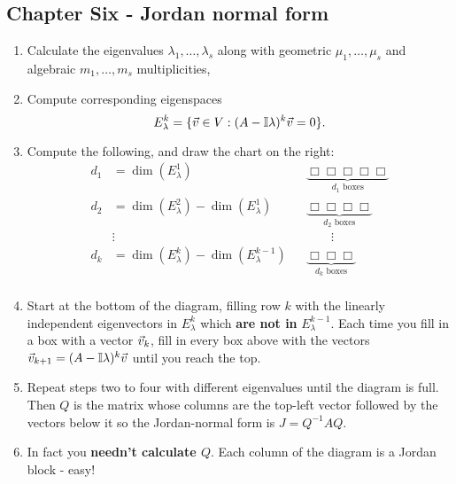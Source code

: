 \noindent\dotfill
\begin{multicols}{2}
\section*{Chapter Six - Jordan normal form}
\begin{enumerate}
    \item{\vspace{-1ex}Calculate the eigenvalues $\lambda_1,\dots,\lambda_s$ along with geometric $\mu_1,\dots,\mu_s$ and algebraic $m_1,\dots,m_s$ multiplicities,}
    \item{
    Compute corresponding eigenspaces
    \[E^k_\lambda=\{\vec{v}\in V:(A-\mathbb{I}\lambda)^k\vec{v}=0\}.\]}
    \item{Compute the following, and draw the chart on the right:
      \begin{align*}
          d_1 &= \dim(E_\lambda^1) 
            &&\underbrace{\Box \Box \Box \Box \Box}_{d_1\text{ boxes}}\\
          d_2 &= \dim(E_\lambda^2) - \dim(E_\lambda^1)
            &&\underbrace{\Box \Box \Box \Box}_{d_2\text{ boxes}}\\
          &\vdots && \quad\quad\vdots \\
          d_k &= \dim(E_\lambda^k) - \dim(E_\lambda^{k-1})
            &&\underbrace{\Box \Box \Box}_{d_k\text{ boxes}}\\
      \end{align*}}
    \item{Start at the bottom of the diagram, filling row $k$ with the linearly independent eigenvectors in $E_\lambda^k$ which \textbf{are not in} $E_\lambda^{k-1}$. Each time you fill in a box with a vector $\vec{v}_k$, fill in every box above with the vectors $\vec{v}_{k+1}=(A-\mathbb{I}\lambda)^k\vec{v}$ until you reach the top.}
    \item{Repeat steps two to four with different eigenvalues until the diagram is full. Then $Q$ is the matrix whose columns are the top-left vector followed by the vectors below it so the Jordan-normal form is $J=Q^{-1}AQ$.}
    \item{In fact you \textbf{needn't calculate $Q$}. Each column of the diagram is a Jordan block - easy!}
\end{enumerate}

\end{multicols}